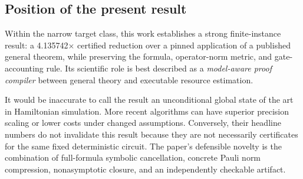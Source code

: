 \subsection{Position of the present result}

Within the narrow target class, this work establishes a strong finite-instance
result: a 4.135742$\times$ certified reduction over a pinned application of a
published general theorem, while preserving the formula, operator-norm metric,
and gate-accounting rule.  Its scientific role is best described as a
\emph{model-aware proof compiler} between general theory and executable
resource estimation.

It would be inaccurate to call the result an unconditional global state of the
art in Hamiltonian simulation.  More recent algorithms can have superior
precision scaling or lower costs under changed assumptions.  Conversely,
their headline numbers do not invalidate this result because they are not
necessarily certificates for the same fixed deterministic circuit.  The
paper's defensible novelty is the combination of full-formula symbolic
cancellation, concrete Pauli norm compression, nonasymptotic closure, and an
independently checkable artifact.
